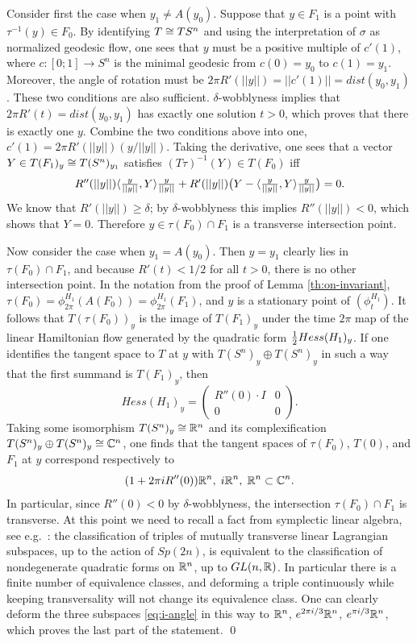 \documentclass[10pt,letterpaper]{article}
\begin{document}
\proof Consider first the case when $y_1 \neq A(y_0)$. Suppose that $y \in F_1$
is a point with $\tau^{-1}(y) \in F_0$. By identifying $T \cong TS^n$ and using
the interpretation of $\sigma$ as normalized geodesic flow, one sees that $y$
must be a positive multiple of $c'(1)$, where $c: [0;1] \rightarrow S^n$ is the
minimal geodesic from $c(0) = y_0$ to $c(1) = y_1$. Moreover, the angle of
rotation must be $2\pi R'(||y||) = ||c'(1)|| = dist(y_0,y_1)$. These two
conditions are also sufficient. $\delta$-wobblyness implies that $2\pi R'(t) =
dist(y_0,y_1)$ has exactly one solution $t > 0$, which proves that there is
exactly one $y$. Combine the two conditions above into one, $c'(1) = 2\pi
R'(||y||)(y/||y||)$. Taking the derivative, one sees that a vector $Y \in
T(F_1)_y \cong T(S^n)_{y_1}$ satisfies $(T\tau)^{-1}(Y) \in T(F_0)$ iff
\[
 \textstyle R''(||y||) \langle \frac{y}{||y||}, Y \rangle \frac{y}{||y||} +
 R'(||y||) \big( Y - \langle \frac{y}{||y||}, Y \rangle \frac{y}{||y||} \big) = 0.
\]
We know that $R'(||y||) \geq \delta$; by $\delta$-wobblyness this implies
$R''(||y||) < 0$, which shows that $Y = 0$. Therefore $y \in \tau(F_0) \cap
F_1$ is a transverse intersection point.

Now consider the case when $y_1 = A(y_0)$. Then $y = y_1$ clearly lies in
$\tau(F_0) \cap F_1$, and because $R'(t) < 1/2$ for all $t>0$, there is no
other intersection point. In the notation from the proof of Lemma
\ref{th:on-invariant}, $\tau(F_0) = \phi^{H_1}_{2\pi}(A(F_0)) =
\phi^{H_1}_{2\pi}(F_1)$, and $y$ is a stationary point of $(\phi^{H_1}_t)$. It
follows that $T(\tau(F_0))_y$ is the image of $T(F_1)_y$ under the time $2\pi$
map of the linear Hamiltonian flow generated by the quadratic form ${\textstyle\frac{1}{2}}
Hess(H_1)_y$. If one identifies the tangent space to $T$ at $y$ with $T(S^n)_y
\oplus T(S^n)_y$ in such a way that the first summand is $T(F_1)_y$, then
\[
Hess(H_1)_y = \begin{pmatrix} R''(0) \cdot I & 0 \\ 0 & 0 \end{pmatrix}.
\]
Taking some isomorphism $T(S^n)_y \cong \mathbb{R}^n$ and its complexification $T(S^n)_y
\oplus T(S^n)_y \cong \mathbb{C}^n$, one finds that the tangent spaces of $\tau(F_0)$,
$T(0)$, and $F_1$ at $y$ correspond respectively to
\begin{equation} \label{eq:i-angle}
(1 + 2\pi i R''(0)) \mathbb{R}^n,\; i\mathbb{R}^n, \; \mathbb{R}^n \subset \mathbb{C}^n.
\end{equation}
In particular, since $R''(0) < 0$ by $\delta$-wobblyness, the intersection
$\tau(F_0) \cap F_1$ is transverse. At this point we need to recall a fact from
symplectic linear algebra, see e.g.\ \cite[p.\ 40]{lion-vergne}: the
classification of triples of mutually transverse linear Lagrangian subspaces,
up to the action of $Sp(2n)$, is equivalent to the classification of
nondegenerate quadratic forms on $\mathbb{R}^n$, up to $GL(n,\mathbb{R})$. In particular there
is a finite number of equivalence classes, and deforming a triple continuously
while keeping transversality will not change its equivalence class. One can
clearly deform the three subspaces \eqref{eq:i-angle} in this way to $\mathbb{R}^n$,
$e^{2\pi i/3}\mathbb{R}^n$, $e^{\pi i/3}\mathbb{R}^n$, which proves the last part of the
statement. \qed
\end{document}
